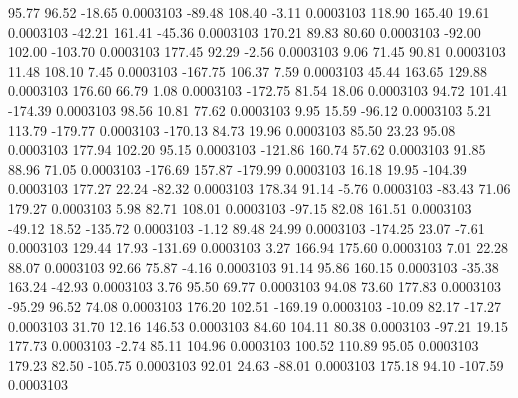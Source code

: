        95.77       96.52      -18.65     0.0003103
      -89.48      108.40       -3.11     0.0003103
      118.90      165.40       19.61     0.0003103
      -42.21      161.41      -45.36     0.0003103
      170.21       89.83       80.60     0.0003103
      -92.00      102.00     -103.70     0.0003103
      177.45       92.29       -2.56     0.0003103
        9.06       71.45       90.81     0.0003103
       11.48      108.10        7.45     0.0003103
     -167.75      106.37        7.59     0.0003103
       45.44      163.65      129.88     0.0003103
      176.60       66.79        1.08     0.0003103
     -172.75       81.54       18.06     0.0003103
       94.72      101.41     -174.39     0.0003103
       98.56       10.81       77.62     0.0003103
        9.95       15.59      -96.12     0.0003103
        5.21      113.79     -179.77     0.0003103
     -170.13       84.73       19.96     0.0003103
       85.50       23.23       95.08     0.0003103
      177.94      102.20       95.15     0.0003103
     -121.86      160.74       57.62     0.0003103
       91.85       88.96       71.05     0.0003103
     -176.69      157.87     -179.99     0.0003103
       16.18       19.95     -104.39     0.0003103
      177.27       22.24      -82.32     0.0003103
      178.34       91.14       -5.76     0.0003103
      -83.43       71.06      179.27     0.0003103
        5.98       82.71      108.01     0.0003103
      -97.15       82.08      161.51     0.0003103
      -49.12       18.52     -135.72     0.0003103
       -1.12       89.48       24.99     0.0003103
     -174.25       23.07       -7.61     0.0003103
      129.44       17.93     -131.69     0.0003103
        3.27      166.94      175.60     0.0003103
        7.01       22.28       88.07     0.0003103
       92.66       75.87       -4.16     0.0003103
       91.14       95.86      160.15     0.0003103
      -35.38      163.24      -42.93     0.0003103
        3.76       95.50       69.77     0.0003103
       94.08       73.60      177.83     0.0003103
      -95.29       96.52       74.08     0.0003103
      176.20      102.51     -169.19     0.0003103
      -10.09       82.17      -17.27     0.0003103
       31.70       12.16      146.53     0.0003103
       84.60      104.11       80.38     0.0003103
      -97.21       19.15      177.73     0.0003103
       -2.74       85.11      104.96     0.0003103
      100.52      110.89       95.05     0.0003103
      179.23       82.50     -105.75     0.0003103
       92.01       24.63      -88.01     0.0003103
      175.18       94.10     -107.59     0.0003103
